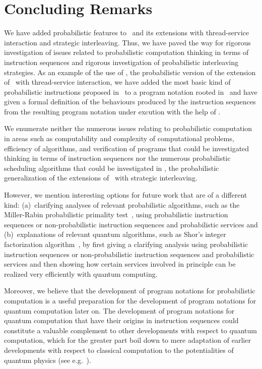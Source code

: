 \documentclass{llncs}
\begin{document}
\section{Concluding Remarks}
\label{sect-concl}

We have added probabilistic features to \BTA\ and its extensions with 
thread-service interaction and strategic interleaving.
Thus, we have paved the way for rigorous investigation of issues related
to probabilistic computation thinking in terms of instruction sequences
and rigorous investigation of probabilistic interleaving strategies.
As an example of the use of \prTSI, the probabilistic version of the 
extension of \BTA\ with thread-service interaction, we have added the 
most basic kind of probabilistic instructions proposed in~\cite{BM09f} 
to a program notation rooted in \PGA\ and have given a formal definition 
of the behaviours produced by the instruction sequences from the 
resulting program notation under excution with the help of \prTSI.

We enumerate neither the numerous issues relating to probabilistic 
computation in areas such as computability and complexity of 
computational problems, efficiency of algorithms, and verification of 
programs that could be investigated thinking in terms of instruction 
sequences nor the numerous probabilistic scheduling algorithms that 
could be investigated in \prTA, the probabilistic generalization of the 
extensions of \BTA\ with strategic interleaving.

However, we mention interesting options for future work that are of a 
different kind:
(a)~clarifying analyses of relevant probabilistic algorithms, such as 
the Miller-Rabin probabilistic primality test~\cite{Rab76a}, using 
probabilistic instruction sequences or non-probabilistic instruction 
sequences and probabilistic services and
(b)~explanations of relevant quantum algorithms, such as Shor's integer
factorization algorithm~\cite{Sho94a}, by first giving a clarifying
analysis using probabilistic instruction sequences or non-probabilistic 
instruction sequences and probabilistic services and then showing how 
certain services involved in principle can be realized very efficiently 
with quantum computing.

Moreover, we believe that the development of program notations for 
probabilistic computation is a useful preparation for the development of 
program notations for quantum computation later on.
The development of program notations for quantum computation that have 
their origins in instruction sequences could constitute a valuable 
complement to other developments with respect to quantum computation, 
which for the greater part boil down to mere adaptation of earlier 
developments with respect to classical computation to the potentialities 
of quantum physics (see e.g.~\cite{Gay06a}).
\end{document}
